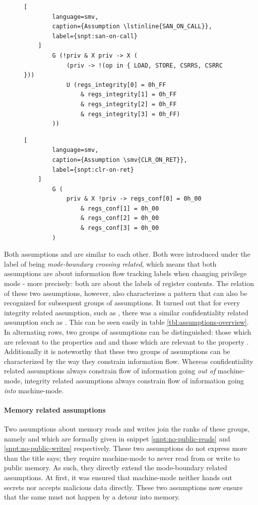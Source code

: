 \begin{figure}
    \begin{lstlisting}[
        language=smv,
        caption={Assumption \lstinline{SAN_ON_CALL}},
        label={snpt:san-on-call}
    ]
        G (!priv & X priv -> X (
            (priv -> !(op in { LOAD, STORE, CSRRS, CSRRC }))
            U (regs_integrity[0] = 0h_FF
                & regs_integrity[1] = 0h_FF
                & regs_integrity[2] = 0h_FF
                & regs_integrity[3] = 0h_FF)
        ))
    \end{lstlisting}

    \begin{lstlisting}[
        language=smv,
        caption={Assumption \smv{CLR_ON_RET}},
        label={snpt:clr-on-ret}
    ]
        G (
            priv & X !priv -> regs_conf[0] = 0h_00
                & regs_conf[1] = 0h_00
                & regs_conf[2] = 0h_00
                & regs_conf[3] = 0h_00
        )
    \end{lstlisting}
\end{figure}

Both assumptions  and  are similar to each other.
Both were introduced under the label of being \textit{mode-boundary crossing related}, which means that both assumptions are about information flow tracking labels when changing privilege mode - more precisely: both are about the labels of register contents.
The relation of these two assumptions, however, also characterizes a pattern that can also be recognized for subsequent groups of assumptions.
It turned out that for every integrity related assumption, such as , there was a similar confidentiality related assumption such as .
This can be seen easily in table \ref{tbl:assumptions-overview}.
In alternating rows, two groups of assumptions can be distinguished: those which are relevant to the properties  and  and those which are relevant to the property .
Additionally it is noteworthy that these two groups of assumptions can be characterized by the way they constrain information flow.
Whereas confidentiality related assumptions always constrain flow of information going \textit{out of} machine-mode, integrity related assumptions always constrain flow of information going \textit{into} machine-mode.

\paragraph{Memory related assumptions}
Two assumptions about memory reads and writes join the ranks of these groups, namely  and  which are formally given in snippet \ref{snpt:no-public-reads} and \ref{snpt:no-public-writes} respectively.
These two assumptions do not express more than the title says; they require machine-mode to never read from or write to public memory.
As such, they directly extend the mode-boundary related assumptions.
At first, it was ensured that machine-mode neither hands out secrets nor accepts malicious data directly.
These two assumptions now ensure that the same must not happen by a detour into memory.

